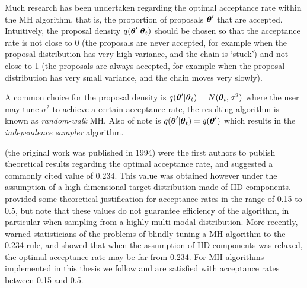 Much research has been undertaken regarding the optimal acceptance rate within the \gls{MH} algorithm, that is, the
proportion of proposals \(\boldsymbol{\theta}'\) that are accepted. Intuitively, the proposal density
\(q(\boldsymbol{\theta}'|\boldsymbol{\theta}_t)\) should be chosen so that the acceptance rate is not close to 0 (the proposals are never
accepted, for example when the proposal distribution has very high variance, and the chain is `stuck') and not close to
1 (the proposals are always accepted, for example when the proposal distribution has very small variance, and the chain
moves very slowly).

A common choice for the proposal density is \(q(\boldsymbol{\theta}' | \boldsymbol{\theta}_t) = N(\boldsymbol{\theta}_t, \sigma^2)\) where the user
may tune \(\sigma^2\) to achieve a certain acceptance rate, the resulting algorithm is known as \textit{random-walk}
\gls{MH}. Also of note is \(q(\boldsymbol{\theta}' | \boldsymbol{\theta}_t) = q(\boldsymbol{\theta}')\) which results in the \textit{independence
sampler} algorithm.

\cite{roberts1997} (the original work was published in 1994) were the first authors to publish theoretical results
regarding the optimal acceptance rate, and suggested a commonly cited value of 0.234. This value was obtained however
under the assumption of a high-dimensional target distribution made of \gls{IID} components. \cite{gelman1996} provided
some theoretical justification for acceptance rates in the range of 0.15 to 0.5, but note that these values do not
guarantee efficiency of the algorithm, in particular when sampling from a highly multi-modal distribution. More
recently, \cite{bedard2008} warned statisticians of the problems of blindly tuning a \gls{MH} algorithm to the 0.234
rule, and showed that when the assumption of \gls{IID} components was relaxed, the optimal acceptance rate may be far
from 0.234. For \gls{MH} algorithms implemented in this thesis we follow \cite{gelman1996} and are satisfied with
acceptance rates between 0.15 and 0.5.

